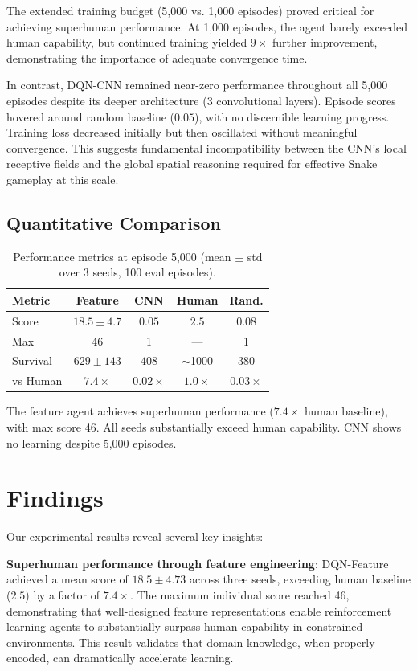 \documentclass[10pt,a4paper,twocolumn]{article}
\begin{document}
The extended training budget (5,000 vs. 1,000 episodes) proved critical for achieving superhuman performance. At 1,000 episodes, the agent barely exceeded human capability, but continued training yielded $9\times$ further improvement, demonstrating the importance of adequate convergence time.

In contrast, DQN-CNN remained near-zero performance throughout all 5,000 episodes despite its deeper architecture (3 convolutional layers). Episode scores hovered around random baseline ($0.05$), with no discernible learning progress. Training loss decreased initially but then oscillated without meaningful convergence. This suggests fundamental incompatibility between the CNN's local receptive fields and the global spatial reasoning required for effective Snake gameplay at this scale.

\subsection{Quantitative Comparison}

\begin{table}[H]
\centering
\small
\caption{Performance metrics at episode 5,000 (mean $\pm$ std over 3 seeds, 100 eval episodes).}
\begin{tabular}{lcccc}
\toprule
\textbf{Metric} & \textbf{Feature} & \textbf{CNN} & \textbf{Human} & \textbf{Rand.} \\
\midrule
Score & $18.5 \pm 4.7$ & $0.05$ & $2.5$ & $0.08$ \\
Max & 46 & 1 & --- & 1 \\
Survival & $629 \pm 143$ & $408$ & $\sim$1000 & $380$ \\
vs Human & $7.4\times$ & $0.02\times$ & $1.0\times$ & $0.03\times$ \\
\bottomrule
\end{tabular}
\end{table}

The feature agent achieves superhuman performance ($7.4\times$ human baseline), with max score 46. All seeds substantially exceed human capability. CNN shows no learning despite 5,000 episodes.

\section{Findings}

Our experimental results reveal several key insights:

\textbf{Superhuman performance through feature engineering}: DQN-Feature achieved a mean score of $18.5 \pm 4.73$ across three seeds, exceeding human baseline ($2.5$) by a factor of $7.4\times$. The maximum individual score reached 46, demonstrating that well-designed feature representations enable reinforcement learning agents to substantially surpass human capability in constrained environments. This result validates that domain knowledge, when properly encoded, can dramatically accelerate learning.
\end{document}
